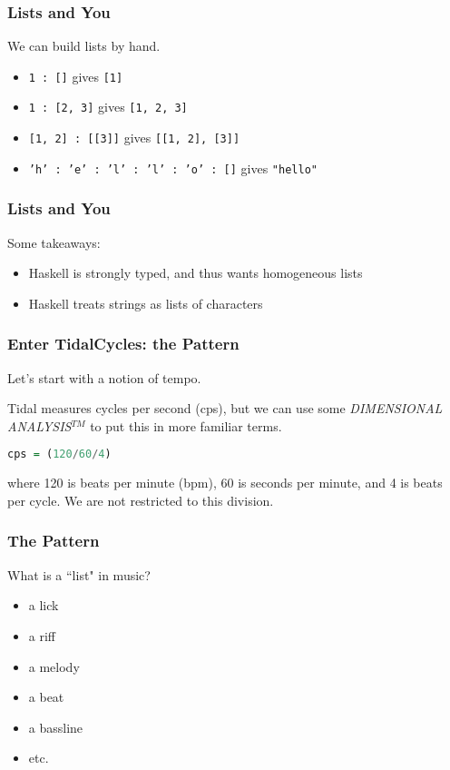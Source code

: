 \documentclass{beamer}
\begin{document}
	\begin{frame}
		\frametitle{Lists and You}
		We can build lists by hand.
		
			\begin{itemize}
				\item \texttt{1 : []} gives \texttt{[1]}
				\item \texttt{1 : [2, 3]} gives \texttt{[1, 2, 3]}
				\item \texttt{[1, 2] : [[3]]} gives \texttt{[[1, 2], [3]]}
				\item \texttt{'h' : 'e' : 'l' : 'l' : 'o' : []} gives \texttt{"hello"}
			\end{itemize}
	\end{frame}

	\begin{frame}
		\frametitle{Lists and You}
		Some takeaways:
		\begin{itemize}
			\item Haskell is strongly typed, and thus wants homogeneous lists
			\item Haskell treats strings as lists of characters
		\end{itemize}
	\end{frame}

	\begin{frame}[fragile]
		\frametitle{Enter TidalCycles: the Pattern}
		Let's start with a notion of tempo.
		
		Tidal measures cycles per second (cps), but we can use some \textit{DIMENSIONAL ANALYSIS}$^{TM}$ to put this in more familiar terms.
		
		\begin{lstlisting}[language=Haskell]
		cps = (120/60/4)
		\end{lstlisting}
		
		where 120 is beats per minute (bpm), 60 is seconds per minute, and 4 is beats per cycle. We are not restricted to this division.
	\end{frame}

	\begin{frame}
		\frametitle{The Pattern}
		What is a ``list" in music?
		\begin{itemize}
			\item a lick
			\item a riff
			\item a melody
			\item a beat
			\item a bassline
			\item etc.
		\end{itemize}
	\end{frame}
\end{document}
